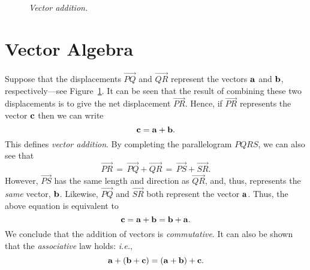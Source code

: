 \begin{figure}
\epsfysize=2.25in
\centerline{}
\caption{\em Vector addition.}\label{fig2}
\end{figure}

\section{Vector Algebra}
Suppose that the displacements $\stackrel{\displaystyle \rightarrow}{PQ}$ and  $\stackrel{\displaystyle \rightarrow}{QR}$
represent the vectors ${\bf a}$ and ${\bf b}$, respectively---see Figure~\ref{fig2}. It can be seen that the result
of combining these two displacements is to give the net displacement $\stackrel{\displaystyle \rightarrow}{PR}$. Hence,
if
 $\stackrel{\displaystyle \rightarrow}{PR}$ represents the vector ${\bf c}$ then we can write
 \begin{equation}
 {\bf c} = {\bf a} + {\bf b}.
 \end{equation}
 This defines {\em vector addition}. 
 By completing the parallelogram $PQRS$, we can also see that
 \begin{equation}
 \stackrel{\displaystyle \rightarrow}{PR} \,= \, \stackrel{\displaystyle \rightarrow}{PQ}+\stackrel{\displaystyle \rightarrow}{QR}\,=\, 
  \stackrel{\displaystyle \rightarrow}{PS}+\stackrel{\displaystyle \rightarrow}{SR}.
  \end{equation}
However, $\stackrel{\displaystyle \rightarrow}{PS}$ has the same length and direction as $\stackrel{\displaystyle \rightarrow}{QR}$,
and, thus, represents the {\em same}\/ vector, ${\bf b}$. Likewise,  $\stackrel{\displaystyle \rightarrow}{PQ}$ and $\stackrel{\displaystyle \rightarrow}{SR}$ both represent the vector ${\bf a}$. Thus, the above equation is equivalent to
\begin{equation}
{\bf c} = {\bf a} + {\bf b} = {\bf b} + {\bf a}.
\end{equation}
We conclude that the addition of vectors is  {\em commutative}.  It can also
be shown that the {\em associative}\/ law  holds: {\em i.e.}, 
\begin{equation}
{\bf a} +
 ({\bf b} + {\bf c}) = ({\bf a} + {\bf b}) + {\bf c}.
 \end{equation}

